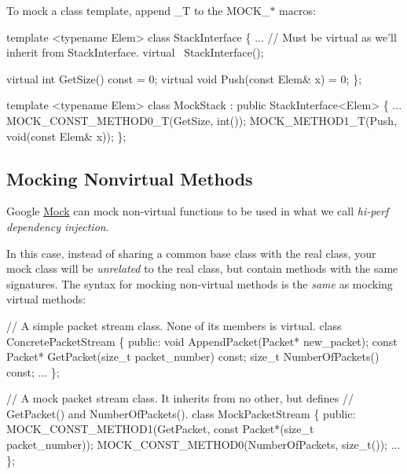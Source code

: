 To mock a class template, append {\ttfamily \+\_\+T} to the {\ttfamily M\+O\+C\+K\+\_\+$\ast$} macros\+:


\begin{DoxyCode}
\textcolor{keyword}{template} <\textcolor{keyword}{typename} Elem>
\textcolor{keyword}{class }StackInterface \{
  ...
  \textcolor{comment}{// Must be virtual as we'll inherit from StackInterface.}
  \textcolor{keyword}{virtual} ~StackInterface();

  \textcolor{keyword}{virtual} \textcolor{keywordtype}{int} GetSize() \textcolor{keyword}{const} = 0;
  \textcolor{keyword}{virtual} \textcolor{keywordtype}{void} Push(\textcolor{keyword}{const} Elem& x) = 0;
\};

\textcolor{keyword}{template} <\textcolor{keyword}{typename} Elem>
\textcolor{keyword}{class }MockStack : \textcolor{keyword}{public} StackInterface<Elem> \{
  ...
  MOCK\_CONST\_METHOD0\_T(GetSize, \textcolor{keywordtype}{int}());
  MOCK\_METHOD1\_T(Push, \textcolor{keywordtype}{void}(\textcolor{keyword}{const} Elem& x));
\};
\end{DoxyCode}


\subsection*{Mocking Nonvirtual Methods}

Google \hyperlink{classMock}{Mock} can mock non-\/virtual functions to be used in what we call {\itshape hi-\/perf dependency injection}.

In this case, instead of sharing a common base class with the real class, your mock class will be {\itshape unrelated} to the real class, but contain methods with the same signatures. The syntax for mocking non-\/virtual methods is the {\itshape same} as mocking virtual methods\+:


\begin{DoxyCode}
\textcolor{comment}{// A simple packet stream class.  None of its members is virtual.}
\textcolor{keyword}{class }ConcretePacketStream \{
 \textcolor{keyword}{public}:
  \textcolor{keywordtype}{void} AppendPacket(Packet* new\_packet);
  \textcolor{keyword}{const} Packet* GetPacket(\textcolor{keywordtype}{size\_t} packet\_number) \textcolor{keyword}{const};
  \textcolor{keywordtype}{size\_t} NumberOfPackets() \textcolor{keyword}{const};
  ...
\};

\textcolor{comment}{// A mock packet stream class.  It inherits from no other, but defines}
\textcolor{comment}{// GetPacket() and NumberOfPackets().}
\textcolor{keyword}{class }MockPacketStream \{
 \textcolor{keyword}{public}:
  MOCK\_CONST\_METHOD1(GetPacket, \textcolor{keyword}{const} Packet*(\textcolor{keywordtype}{size\_t} packet\_number));
  MOCK\_CONST\_METHOD0(NumberOfPackets, \textcolor{keywordtype}{size\_t}());
  ...
\};
\end{DoxyCode}


